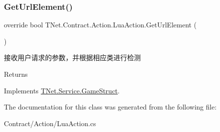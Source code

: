 \subsubsection{\texorpdfstring{Get\+Url\+Element()}{GetUrlElement()}}
{\footnotesize\ttfamily override bool T\+Net.\+Contract.\+Action.\+Lua\+Action.\+Get\+Url\+Element (\begin{DoxyParamCaption}{ }\end{DoxyParamCaption})\hspace{0.3cm}{\ttfamily [virtual]}}



接收用户请求的参数，并根据相应类进行检测 

\begin{DoxyReturn}{Returns}

\end{DoxyReturn}


Implements \mbox{\hyperlink{class_t_net_1_1_service_1_1_game_struct_ad4167cb7ce62183a1336ebc30a848bfc}{T\+Net.\+Service.\+Game\+Struct}}.



The documentation for this class was generated from the following file\+:\begin{DoxyCompactItemize}
\item 
Contract/\+Action/Lua\+Action.\+cs\end{DoxyCompactItemize}
